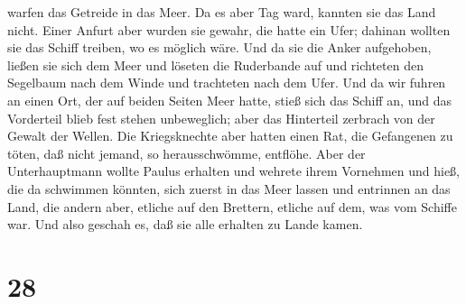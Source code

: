 warfen das Getreide in das Meer.  Da es aber Tag ward,
kannten sie das Land nicht. Einer Anfurt aber wurden sie gewahr, die
hatte ein Ufer; dahinan wollten sie das Schiff treiben, wo es möglich
wäre.  Und da sie die Anker aufgehoben, ließen sie sich dem
Meer und löseten die Ruderbande auf und richteten den Segelbaum nach dem
Winde und trachteten nach dem Ufer.  Und da wir fuhren an
einen Ort, der auf beiden Seiten Meer hatte, stieß sich das Schiff an,
und das Vorderteil blieb fest stehen unbeweglich; aber das Hinterteil
zerbrach von der Gewalt der Wellen.  Die Kriegsknechte aber
hatten einen Rat, die Gefangenen zu töten, daß nicht jemand, so
herausschwömme, entflöhe.  Aber der Unterhauptmann wollte
Paulus erhalten und wehrete ihrem Vornehmen und hieß, die da schwimmen
könnten, sich zuerst in das Meer lassen und entrinnen an das Land,
 die andern aber, etliche auf den Brettern, etliche auf
dem, was vom Schiffe war. Und also geschah es, daß sie alle erhalten zu
Lande kamen.

\hypertarget{section-27}{%
\section{28}\label{section-27}}

